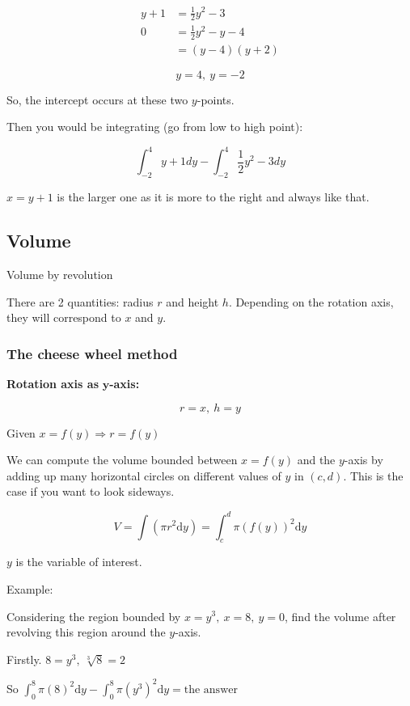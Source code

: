 \documentclass[12pt]{article}
\theoremstyle{plain}
\theoremstyle{remark}
\theoremstyle{definition}
\begin{document}
\begin{align*}
y + 1 &= \frac{1}{2}y^{2} - 3 \\
0 &= \frac{1}{2}y^{2} - y - 4 \\
&= (y - 4)(y + 2)
\end{align*}


\[y = 4,\ y = - 2\]

So, the intercept occurs at these two \(y\)-points.

Then you would be integrating (go from low to high point):

\[\int_{- 2}^{4}{y + 1dy} - \int_{- 2}^{4}{\frac{1}{2}y^{2} - 3dy}\]

\(x = y + 1\) is the larger one as it is more to the right and always
like that.


\subsection{Volume}

Volume by revolution

There are 2 quantities: radius \(r\) and height \(h\). Depending on the
rotation axis, they will correspond to \(x\) and \(y\).


\subsubsection{The cheese wheel method}

\textbf{Rotation axis as} \(\mathbf{y}\)\textbf{-axis: \textbar{}}

\[r = x,\ h = y\]

Given \(x = f(y) \Rightarrow r = f(y)\)

We can compute the volume bounded between \(x = f(y)\) and the
\(y\)-axis by adding up many horizontal circles on different values of
\(y\) in \((c,d)\). This is the case if you want to look sideways.

\[V = \int\left( \pi r^{2}\text{d}y \right) = \int_{c}^{d}{\pi\left( f(y) \right)^{2}\text{d}y}\]

\(y\) is the variable of interest.


Example:

Considering the region bounded by \(x = y^{3},\ x = 8,\ y = 0\), find
the volume after revolving this region around the \(y\)-axis.

Firstly. \(8 = y^{3},\ \sqrt[3]{8} = 2\)

So
\(\int_{0}^{8}{\pi{(8)}^{2}\text{d}y} - \int_{0}^{8}{\pi\left( y^{3} \right)^{2}\text{d}y} = \text{the\ answer}\)
\end{document}
